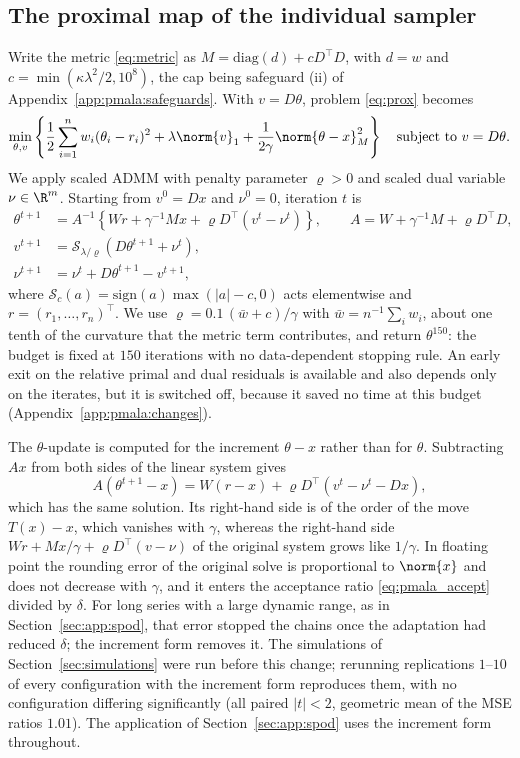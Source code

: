 \subsection{The proximal map of the individual sampler}
\label{app:pmala:admm}

Write the metric \eqref{eq:metric} as $M = \mathrm{diag}(d) + cD^\top D$, with $d = w$ and $c = \min(\kappa\lambda^2/2, 10^8)$, the cap being safeguard (ii) of Appendix~\ref{app:pmala:safeguards}. With $v = D\theta$, problem \eqref{eq:prox} becomes
\[
\min_{\theta, v}\left\{\frac12\sum_{i=1}^n w_i(\theta_i - r_i)^2 + \lambda\norm{v}_1 + \frac{1}{2\gamma}\norm{\theta - x}_M^2\right\} \quad \text{subject to } v = D\theta .
\]
We apply scaled ADMM with penalty parameter $\varrho > 0$ and scaled dual variable $\nu \in \R^m$. Starting from $v^0 = Dx$ and $\nu^0 = 0$, iteration $t$ is
\begin{align*}
\theta^{t+1} &= A^{-1}\left\{ W r + \gamma^{-1} M x + \varrho D^\top (v^t - \nu^t) \right\}, \qquad A = W + \gamma^{-1} M + \varrho D^\top D, \\
v^{t+1} &= \mathcal{S}_{\lambda/\varrho}\!\left(D\theta^{t+1} + \nu^t\right), \\
\nu^{t+1} &= \nu^t + D\theta^{t+1} - v^{t+1},
\end{align*}
where $\mathcal{S}_c(a) = \mathrm{sign}(a)\max(|a| - c, 0)$ acts elementwise and $r = (r_1,\ldots,r_n)^\top$. We use $\varrho = 0.1\,(\bar w + c)/\gamma$ with $\bar w = n^{-1}\sum_i w_i$, about one tenth of the curvature that the metric term contributes, and return $\theta^{150}$: the budget is fixed at $150$ iterations with no data-dependent stopping rule. An early exit on the relative primal and dual residuals is available and also depends only on the iterates, but it is switched off, because it saved no time at this budget (Appendix~\ref{app:pmala:changes}).

The $\theta$-update is computed for the increment $\theta - x$ rather than for $\theta$. Subtracting $Ax$ from both sides of the linear system gives
\[
A(\theta^{t+1} - x) = W(r - x) + \varrho D^\top\left(v^t - \nu^t - Dx\right),
\]
which has the same solution. Its right-hand side is of the order of the move $T(x) - x$, which vanishes with $\gamma$, whereas the right-hand side $Wr + Mx/\gamma + \varrho D^\top(v - \nu)$ of the original system grows like $1/\gamma$. In floating point the rounding error of the original solve is proportional to $\norm{x}$ and does not decrease with $\gamma$, and it enters the acceptance ratio \eqref{eq:pmala_accept} divided by $\delta$. For long series with a large dynamic range, as in Section~\ref{sec:app:spod}, that error stopped the chains once the adaptation had reduced $\delta$; the increment form removes it. The simulations of Section~\ref{sec:simulations} were run before this change; rerunning replications $1$--$10$ of every configuration with the increment form reproduces them, with no configuration differing significantly (all paired $|t| < 2$, geometric mean of the MSE ratios $1.01$). The application of Section~\ref{sec:app:spod} uses the increment form throughout.

